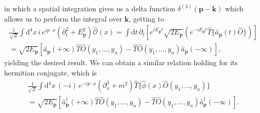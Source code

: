 in which a spatial integration gives us a delta function \(\delta^{(3)}(\mathbf{p} - \mathbf{k})\) which allows us to perform the integral over \(\mathbf{k}\), getting to
\[
    \begin{aligned}
        \frac{1}{\sqrt{Z}} \int \mathrm{d}^4 x \, i \, e^{ip \cdot x} (\partial_t^2 + E_{\mathbf{p}}^2) \hat{\mathcal{O}}(x) = \int \mathrm{d} t \, \partial_t \left[ e^{i E_{\mathbf{p}} t} \sqrt{2E_{\mathbf{p}}} \left( e^{-i E_{\mathbf{p}} t} \hat{T} \{ \hat{a}_{\mathbf{p}}(t) \hat{O} \} \right)\right] \\
        = \sqrt{2E_{\mathbf{p}}} \left[ \hat{a}_{\mathbf{p}}(+\infty) \hat{T} \hat{O}(y_1, \ldots, y_n) - \hat{T} \hat{O}(y_1, \ldots, y_n) \hat{a}_{\mathbf{p}}(-\infty)\right],
    \end{aligned}
\]
yielding the desired result. We can obtain a similar relation holding for its hermitian conjugate, which is
\[
    \begin{aligned}
        \frac{1}{\sqrt{Z}} \int \mathrm{d}^4 x \, (-i) \, e^{-ip \cdot x} (\partial_x^2 + m^2) \hat{T} \{\hat{\phi}(x) \hat{O} (y_1,\ldots,y_n)\} \\
        = \sqrt{2E_{\mathbf{p}}} \left[ \hat{a}_{\mathbf{p}}^{\dagger}(+\infty) \hat{T} \hat{O}(y_1, \ldots, y_n) - \hat{T} \hat{O}(y_1, \ldots, y_n) \hat{a}^{\dagger}_{\mathbf{p}}(-\infty)\right].
    \end{aligned}
\]

